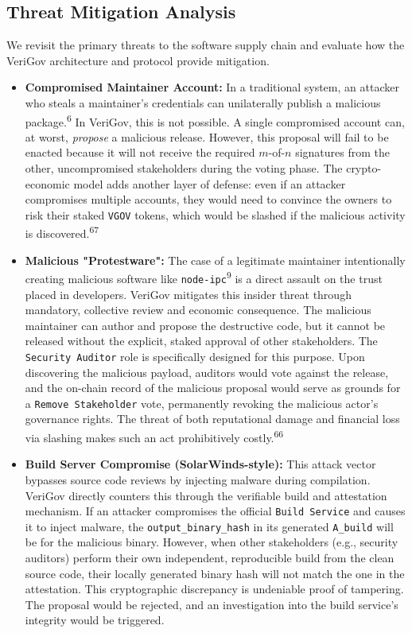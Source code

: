 \documentclass{article}
\begin{document}
\subsection{Threat Mitigation Analysis}

We revisit the primary threats to the software supply chain and evaluate how the VeriGov architecture and protocol provide mitigation.

\begin{itemize}
\item \textbf{Compromised Maintainer Account:} In a traditional system, an attacker who steals a maintainer's credentials can unilaterally publish a malicious package.\textsuperscript{6} In VeriGov, this is not possible. A single compromised account can, at worst, \emph{propose} a malicious release. However, this proposal will fail to be enacted because it will not receive the required $m$-of-$n$ signatures from the other, uncompromised stakeholders during the voting phase. The crypto-economic model adds another layer of defense: even if an attacker compromises multiple accounts, they would need to convince the owners to risk their staked \lstinline{VGOV} tokens, which would be slashed if the malicious activity is discovered.\textsuperscript{67}
\item \textbf{Malicious "Protestware":} The case of a legitimate maintainer intentionally creating malicious software like \lstinline{node-ipc}\textsuperscript{9} is a direct assault on the trust placed in developers. VeriGov mitigates this insider threat through mandatory, collective review and economic consequence. The malicious maintainer can author and propose the destructive code, but it cannot be released without the explicit, staked approval of other stakeholders. The \lstinline{Security Auditor} role is specifically designed for this purpose. Upon discovering the malicious payload, auditors would vote against the release, and the on-chain record of the malicious proposal would serve as grounds for a \lstinline{Remove Stakeholder} vote, permanently revoking the malicious actor's governance rights. The threat of both reputational damage and financial loss via slashing makes such an act prohibitively costly.\textsuperscript{66}
\item \textbf{Build Server Compromise (SolarWinds-style):} This attack vector bypasses source code reviews by injecting malware during compilation. VeriGov directly counters this through the verifiable build and attestation mechanism. If an attacker compromises the official \lstinline{Build Service} and causes it to inject malware, the \lstinline{output_binary_hash} in its generated \lstinline{A_build} will be for the malicious binary. However, when other stakeholders (e.g., security auditors) perform their own independent, reproducible build from the clean source code, their locally generated binary hash will not match the one in the attestation. This cryptographic discrepancy is undeniable proof of tampering. The proposal would be rejected, and an investigation into the build service's integrity would be triggered.

\end{itemize}
\end{document}
